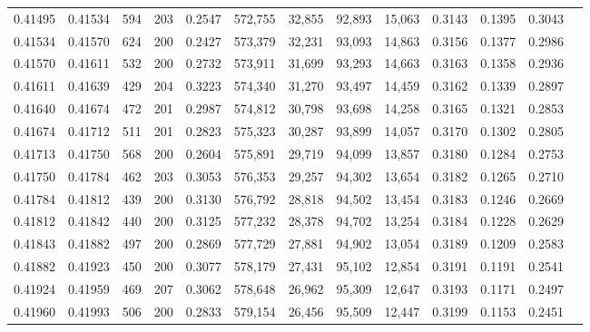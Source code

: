 \begin{tabular}{rrrrrrrrrrrrr}
0.41495 & 0.41534 &   594 & 203 &                                     0.2547 & 572,755 &  32,855 &  92,893 &  15,063 & 0.3143 & 0.1395 & 0.3043 \\
0.41534 & 0.41570 &   624 & 200 &                                     0.2427 & 573,379 &  32,231 &  93,093 &  14,863 & 0.3156 & 0.1377 & 0.2986 \\
0.41570 & 0.41611 &   532 & 200 &                                     0.2732 & 573,911 &  31,699 &  93,293 &  14,663 & 0.3163 & 0.1358 & 0.2936 \\
0.41611 & 0.41639 &   429 & 204 &                                     0.3223 & 574,340 &  31,270 &  93,497 &  14,459 & 0.3162 & 0.1339 & 0.2897 \\
0.41640 & 0.41674 &   472 & 201 &                                     0.2987 & 574,812 &  30,798 &  93,698 &  14,258 & 0.3165 & 0.1321 & 0.2853 \\
0.41674 & 0.41712 &   511 & 201 &                                     0.2823 & 575,323 &  30,287 &  93,899 &  14,057 & 0.3170 & 0.1302 & 0.2805 \\
0.41713 & 0.41750 &   568 & 200 &                                     0.2604 & 575,891 &  29,719 &  94,099 &  13,857 & 0.3180 & 0.1284 & 0.2753 \\
0.41750 & 0.41784 &   462 & 203 &                                     0.3053 & 576,353 &  29,257 &  94,302 &  13,654 & 0.3182 & 0.1265 & 0.2710 \\
0.41784 & 0.41812 &   439 & 200 &                                     0.3130 & 576,792 &  28,818 &  94,502 &  13,454 & 0.3183 & 0.1246 & 0.2669 \\
0.41812 & 0.41842 &   440 & 200 &                                     0.3125 & 577,232 &  28,378 &  94,702 &  13,254 & 0.3184 & 0.1228 & 0.2629 \\
0.41843 & 0.41882 &   497 & 200 &                                     0.2869 & 577,729 &  27,881 &  94,902 &  13,054 & 0.3189 & 0.1209 & 0.2583 \\
0.41882 & 0.41923 &   450 & 200 &                                     0.3077 & 578,179 &  27,431 &  95,102 &  12,854 & 0.3191 & 0.1191 & 0.2541 \\
0.41924 & 0.41959 &   469 & 207 &                                     0.3062 & 578,648 &  26,962 &  95,309 &  12,647 & 0.3193 & 0.1171 & 0.2497 \\
0.41960 & 0.41993 &   506 & 200 &                                     0.2833 & 579,154 &  26,456 &  95,509 &  12,447 & 0.3199 & 0.1153 & 0.2451 \\

\end{tabular}
